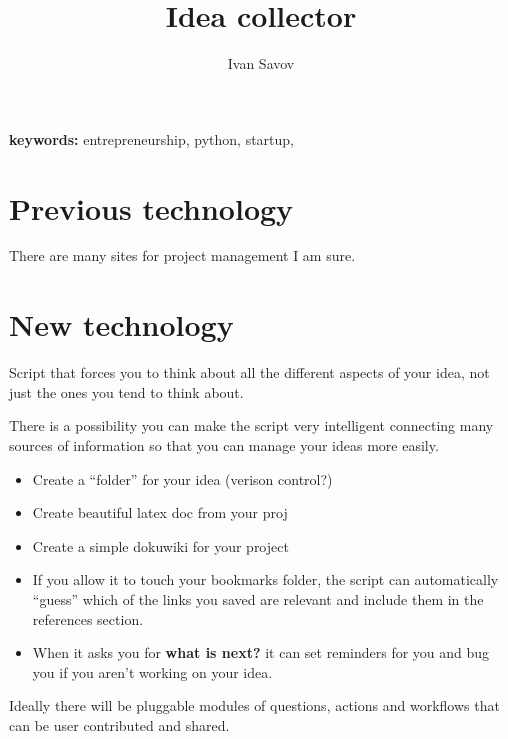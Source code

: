 \documentclass[12pt]{article}
\author{Ivan Savov}
\title{ {\Huge Idea collector } }
\newcommand{\term}[1]{{\ttfamily #1}}
\begin{document}
\maketitle


{\bf keywords: } entrepreneurship, python, startup, 


\section{Previous technology}

	There are many sites for project management I am sure.
	
    
\section{New technology}

	Script that forces you to think about all the different aspects of your idea, not just
	the ones you tend to think about.
	
	There is a possibility you can make the script very intelligent connecting many sources
	of information so that you can manage your ideas more easily.	
	
	\begin{itemize}
		\item 	Create a ``folder'' for your idea (verison control?)
		\item	Create beautiful latex doc from your proj
		\item	Create a simple dokuwiki for your project
		\item 	If you allow it to touch your bookmarks folder, the script can automatically ``guess'' which
				of the links you saved are relevant and include them in the references section.
		\item	When it asks you for {\bf what is next?} it can set reminders for you and bug you if 
				you aren't working on your idea.
	\end{itemize}
	
	
	Ideally there will be pluggable modules of \term{questions}, \term{actions} and 
	\term{workflows} that can be user contributed and shared.
	
\end{document}

